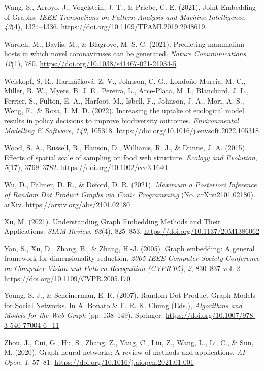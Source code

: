 \documentclass[10pt,oneside]{article}
\newlength{\cslhangindent}
\newenvironment{CSLReferences}[2] %
 {%
  \setlength{\parindent}{0pt}
  \ifodd #1 \everypar{\setlength{\hangindent}{\cslhangindent}}\ignorespaces\fi
  \ifnum #2 > 0
  \setlength{\parskip}{#2\baselineskip}
  \fi
 }%
 {}
\begin{document}
\begin{CSLReferences}{1}{0}
\leavevmode{}%
Wang, S., Arroyo, J., Vogelstein, J. T., \& Priebe, C. E. (2021). Joint
Embedding of Graphs. \emph{IEEE Transactions on Pattern Analysis and
Machine Intelligence}, \emph{43}(4), 1324--1336.
\url{https://doi.org/10.1109/TPAMI.2019.2948619}

\leavevmode{}%
Wardeh, M., Baylis, M., \& Blagrove, M. S. C. (2021). Predicting
mammalian hosts in which novel coronaviruses can be generated.
\emph{Nature Communications}, \emph{12}(1), 780.
\url{https://doi.org/10.1038/s41467-021-21034-5}

\leavevmode{}%
Weiskopf, S. R., Harmáčková, Z. V., Johnson, C. G., Londoño-Murcia, M.
C., Miller, B. W., Myers, B. J. E., Pereira, L., Arce-Plata, M. I.,
Blanchard, J. L., Ferrier, S., Fulton, E. A., Harfoot, M., Isbell, F.,
Johnson, J. A., Mori, A. S., Weng, E., \& Rosa, I. M. D. (2022).
Increasing the uptake of ecological model results in policy decisions to
improve biodiversity outcomes. \emph{Environmental Modelling \&
Software}, \emph{149}, 105318.
\url{https://doi.org/10.1016/j.envsoft.2022.105318}

\leavevmode{}%
Wood, S. A., Russell, R., Hanson, D., Williams, R. J., \& Dunne, J. A.
(2015). Effects of spatial scale of sampling on food web structure.
\emph{Ecology and Evolution}, \emph{5}(17), 3769--3782.
\url{https://doi.org/10.1002/ece3.1640}

\leavevmode{}%
Wu, D., Palmer, D. R., \& Deford, D. R. (2021). \emph{Maximum a
Posteriori Inference of Random Dot Product Graphs via Conic Programming}
(No. arXiv:2101.02180). arXiv. \url{https://arxiv.org/abs/2101.02180}

\leavevmode{}%
Xu, M. (2021). Understanding Graph Embedding Methods and Their
Applications. \emph{SIAM Review}, \emph{63}(4), 825--853.
\url{https://doi.org/10.1137/20M1386062}

\leavevmode{}%
Yan, S., Xu, D., Zhang, B., \& Zhang, H.-J. (2005). Graph embedding: A
general framework for dimensionality reduction. \emph{2005 IEEE Computer
Society Conference on Computer Vision and Pattern Recognition
(CVPR'05)}, \emph{2}, 830--837 vol. 2.
\url{https://doi.org/10.1109/CVPR.2005.170}

\leavevmode{}%
Young, S. J., \& Scheinerman, E. R. (2007). Random Dot Product Graph
Models for Social Networks. In A. Bonato \& F. R. K. Chung (Eds.),
\emph{Algorithms and Models for the Web-Graph} (pp. 138--149). Springer.
\url{https://doi.org/10.1007/978-3-540-77004-6_11}

\leavevmode{}%
Zhou, J., Cui, G., Hu, S., Zhang, Z., Yang, C., Liu, Z., Wang, L., Li,
C., \& Sun, M. (2020). Graph neural networks: A review of methods and
applications. \emph{AI Open}, \emph{1}, 57--81.
\url{https://doi.org/10.1016/j.aiopen.2021.01.001}

\end{CSLReferences}
\end{document}
